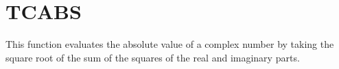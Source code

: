 \section{TCABS}
\label{sect:tcabs}

\noindent This function evaluates the absolute value of a complex number by
taking the square root of the sum of the squares of the real and imaginary
parts.\\
